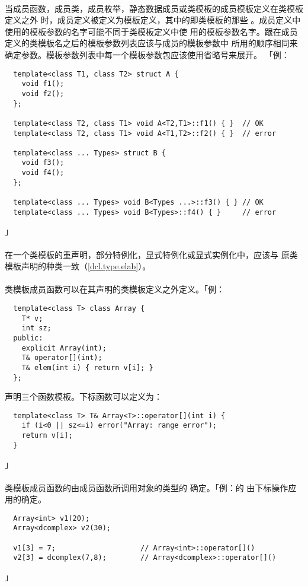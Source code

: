 \paragraph{}
当成员函数，成员类，成员枚举，静态数据成员或类模板的成员模板定义在类模板定义之外
时，成员定义被定义为模板定义，其中的即类模板的那些
。成员定义中使用的模板参数的名字可能不同于类模板定义中使
用的模板参数名字。跟在成员定义的类模板名之后的模板参数列表应该与成员的模板参数中
所用的顺序相同来确定参数。模板参数列表中每一个模板参数包应该使用省略号来展开。
「例：
\begin{lstlisting}
  template<class T1, class T2> struct A {
    void f1();
    void f2();
  };

  template<class T2, class T1> void A<T2,T1>::f1() { }  // OK
  template<class T2, class T1> void A<T1,T2>::f2() { }  // error

  template<class ... Types> struct B {
    void f3();
    void f4();
  };

  template<class ... Types> void B<Types ...>::f3() { } // OK
  template<class ... Types> void B<Types>::f4() { }     // error
\end{lstlisting}」

\paragraph{}
在一个类模板的重声明，部分特例化，显式特例化或显式实例化中，应该与
原类模板声明的种类一致（\ref{dcl.type.elab}）。

\paragraph{}
类模板成员函数可以在其声明的类模板定义之外定义。「例：
\begin{lstlisting}
  template<class T> class Array {
    T* v;
    int sz;
  public:
    explicit Array(int);
    T& operator[](int);
    T& elem(int i) { return v[i]; }
  };
\end{lstlisting}
声明三个函数模板。下标函数可以定义为：
\begin{lstlisting}
  template<class T> T& Array<T>::operator[](int i) {
    if (i<0 || sz<=i) error("Array: range error");
    return v[i];
  }
\end{lstlisting}」

\paragraph{}
类模板成员函数的由成员函数所调用对象的类型的
确定。「例：的
由下标操作应用的确定。
\begin{lstlisting}
  Array<int> v1(20);
  Array<dcomplex> v2(30);

  v1[3] = 7;                    // Array<int>::operator[]()
  v2[3] = dcomplex(7,8);        // Array<dcomplex>::operator[]()
\end{lstlisting}」

